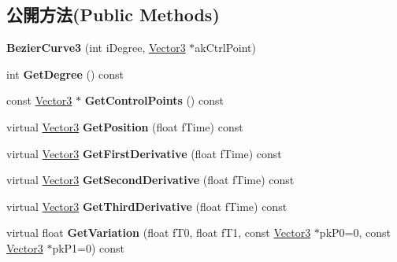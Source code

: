 \subsection*{公開方法(Public Methods)}
\begin{DoxyCompactItemize}
\item 
{\bfseries Bezier\+Curve3} (int i\+Degree, \hyperlink{class_i_dream_sky_1_1_vector3}{Vector3} $\ast$ak\+Ctrl\+Point)\hypertarget{class_i_dream_sky_1_1_bezier_curve3_a2ce503e2bb9e9bbb4582bcc3835a37b9}{}\label{class_i_dream_sky_1_1_bezier_curve3_a2ce503e2bb9e9bbb4582bcc3835a37b9}

\item 
int {\bfseries Get\+Degree} () const \hypertarget{class_i_dream_sky_1_1_bezier_curve3_a7d16a30bc4850e25fba62a36959c7f3f}{}\label{class_i_dream_sky_1_1_bezier_curve3_a7d16a30bc4850e25fba62a36959c7f3f}

\item 
const \hyperlink{class_i_dream_sky_1_1_vector3}{Vector3} $\ast$ {\bfseries Get\+Control\+Points} () const \hypertarget{class_i_dream_sky_1_1_bezier_curve3_a1972b46b652fa7573cd55c38ac39f6c0}{}\label{class_i_dream_sky_1_1_bezier_curve3_a1972b46b652fa7573cd55c38ac39f6c0}

\item 
virtual \hyperlink{class_i_dream_sky_1_1_vector3}{Vector3} {\bfseries Get\+Position} (float f\+Time) const \hypertarget{class_i_dream_sky_1_1_bezier_curve3_ac874928bd126294055b7cc0aad818faf}{}\label{class_i_dream_sky_1_1_bezier_curve3_ac874928bd126294055b7cc0aad818faf}

\item 
virtual \hyperlink{class_i_dream_sky_1_1_vector3}{Vector3} {\bfseries Get\+First\+Derivative} (float f\+Time) const \hypertarget{class_i_dream_sky_1_1_bezier_curve3_a0f0ddd4347c7737e74256fd32f7f5865}{}\label{class_i_dream_sky_1_1_bezier_curve3_a0f0ddd4347c7737e74256fd32f7f5865}

\item 
virtual \hyperlink{class_i_dream_sky_1_1_vector3}{Vector3} {\bfseries Get\+Second\+Derivative} (float f\+Time) const \hypertarget{class_i_dream_sky_1_1_bezier_curve3_a2dfd377402abf8aade711a51d908bd07}{}\label{class_i_dream_sky_1_1_bezier_curve3_a2dfd377402abf8aade711a51d908bd07}

\item 
virtual \hyperlink{class_i_dream_sky_1_1_vector3}{Vector3} {\bfseries Get\+Third\+Derivative} (float f\+Time) const \hypertarget{class_i_dream_sky_1_1_bezier_curve3_a80299aa6404d8d550e115cdb2dec35ba}{}\label{class_i_dream_sky_1_1_bezier_curve3_a80299aa6404d8d550e115cdb2dec35ba}

\item 
virtual float {\bfseries Get\+Variation} (float f\+T0, float f\+T1, const \hyperlink{class_i_dream_sky_1_1_vector3}{Vector3} $\ast$pk\+P0=0, const \hyperlink{class_i_dream_sky_1_1_vector3}{Vector3} $\ast$pk\+P1=0) const \hypertarget{class_i_dream_sky_1_1_bezier_curve3_a0ac424f85c1d4168dacb539e16e25818}{}\label{class_i_dream_sky_1_1_bezier_curve3_a0ac424f85c1d4168dacb539e16e25818}

\end{DoxyCompactItemize}
